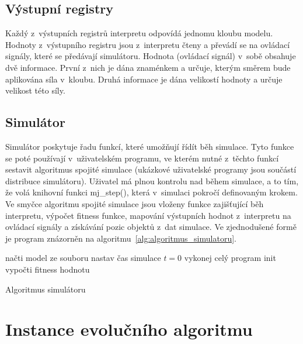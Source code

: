 \subsection{Výstupní registry}

Každý z~výstupních registrů interpretu odpovídá jednomu kloubu modelu.
Hodnoty z~výstupního registru jsou z~interpretu čteny a převádí se na ovládací signály, které se předávají simulátoru.
Hodnota (ovládací signál) v~sobě obsahuje dvě informace.
První z~nich je dána znaménkem a určuje, kterým směrem bude aplikována síla v~kloubu.
Druhá informace je dána velikostí hodnoty a určuje velikost této síly.


\subsection{Simulátor}
Simulátor poskytuje řadu funkcí, které umožňují řídít běh simulace.
Tyto funkce se poté používají v~uživatelském programu, ve kterém nutné z~těchto funkcí sestavit algoritmus spojité simulace (ukázkové uživatelské programy jsou součástí distribuce simulátoru).
Uživatel má plnou kontrolu nad během simulace, a to tím, že volá knihovní funkci mj\_step(), která v~simulaci pokročí definovaným krokem.
Ve smyčce algoritmu spojité simulace jsou vloženy funkce zajišťující běh interpretu, výpočet fitness funkce, mapování výstupních hodnot z~interpretu na ovládací signály a získávání pozic objektů z~dat simulace.
Ve zjednodušené formě je program znázorněn na algoritmu~\ref{alg:algoritmus_simulatoru}.

\begin{algorithm}[H]
    načti model ze souboru\;
    nastav čas simulace $t = 0$\;
    vykonej celý program init\;
    vypočti fitness hodnotu\;
    \caption{Algoritmus simulátoru}
    \label{alg:algoritmus_simulatoru}
\end{algorithm}

\section{Instance evolučního algoritmu}
\label{sec:instance_ea}

